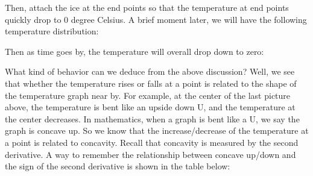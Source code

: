 \documentclass[12pt]{report}
\begin{document}
Then, attach the ice at the end points so that the temperature at end points quickly drop to 0 degree Celsius. A brief moment later, we will have the following temperature distribution:
\begin{center}  \end{center}
Then as time goes by, the temperature will overall drop down to zero:
\begin{center}  \end{center}
What kind of behavior can we deduce from the above discussion? Well, we see that whether the temperature rises or falls at a point is related to the shape of the temperature graph near by. For example, at the center of the last picture above, the temperature is bent like an upside down U, and the temperature at the center decreases.
In mathematics, when a graph is bent like a U, we say the graph is concave up. So we know that the increase/decrease of the temperature at a point is related to concavity. Recall that concavity is measured by the second derivative. A way to remember the relationship between concave up/down and the sign of the second derivative is shown in the table below:
\begin{center}  \end{center}
\end{document}
